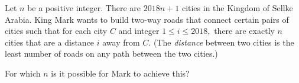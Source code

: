 Let $n$ be a positive integer. There are $2018n+1$ cities in the Kingdom of Sellke Arabia. King Mark wants to build two-way roads that connect certain pairs of cities such that for each city $C$ and integer $1\le i\le 2018,$ there are exactly $n$ cities that are a distance $i$ away from $C.$ (The \emph{distance} between two cities is the least number of roads on any path between the two cities.)
    
For which $n$ is it possible for Mark to achieve this?